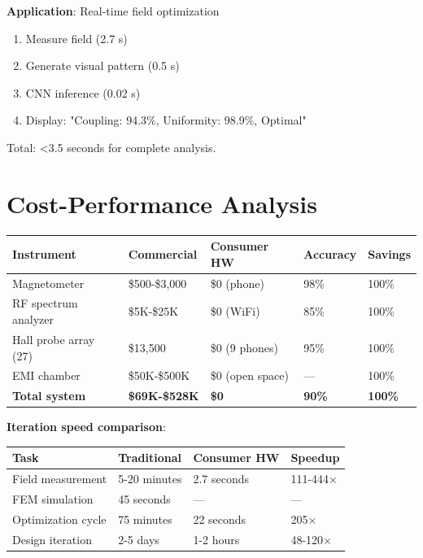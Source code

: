\documentclass[12pt,a4paper]{article}
\begin{document}
\textbf{Application}: Real-time field optimization
\begin{enumerate}
\item Measure field (2.7 s)
\item Generate visual pattern (0.5 s)
\item CNN inference (0.02 s)
\item Display: "Coupling: 94.3\%, Uniformity: 98.9\%, Optimal"
\end{enumerate}

Total: <3.5 seconds for complete analysis.

\section{Cost-Performance Analysis}

\begin{center}
\begin{tabular}{|l|l|l|l|l|}
\hline
\textbf{Instrument} & \textbf{Commercial} & \textbf{Consumer HW} & \textbf{Accuracy} & \textbf{Savings} \\
\hline
Magnetometer & \$500-\$3,000 & \$0 (phone) & 98\% & 100\% \\
RF spectrum analyzer & \$5K-\$25K & \$0 (WiFi) & 85\% & 100\% \\
Hall probe array (27) & \$13,500 & \$0 (9 phones) & 95\% & 100\% \\
EMI chamber & \$50K-\$500K & \$0 (open space) & — & 100\% \\
\hline
\textbf{Total system} & \textbf{\$69K-\$528K} & \textbf{\$0} & \textbf{90\%} & \textbf{100\%} \\
\hline
\end{tabular}
\end{center}

\textbf{Iteration speed comparison}:
\begin{center}
\begin{tabular}{|l|l|l|l|}
\hline
\textbf{Task} & \textbf{Traditional} & \textbf{Consumer HW} & \textbf{Speedup} \\
\hline
Field measurement & 5-20 minutes & 2.7 seconds & 111-444× \\
FEM simulation & 45 seconds & — & — \\
Optimization cycle & 75 minutes & 22 seconds & 205× \\
Design iteration & 2-5 days & 1-2 hours & 48-120× \\
\hline
\end{tabular}
\end{center}
\end{document}
